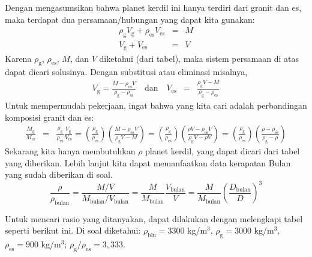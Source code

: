 \documentclass[11pt,fleqn]{exam}
\begin{document}
\begin{questions}
Dengan mengasumsikan bahwa planet kerdil ini hanya terdiri dari granit dan es, maka terdapat dua persamaan/hubungan yang dapat kita gunakan:
\begin{eqnarray*}
\rho_{\text{g}} V_{\text{g}} + \rho_{\text{es}} V_{\text{es}} &=& M\\
V_{\text{g}} + V_{\text{es}} &=& V
\end{eqnarray*}
Karena $\rho_{\text{g}}$, $\rho_{\text{es}}$, $M$, dan $V$ diketahui (dari tabel), maka sistem persamaan di atas dapat dicari solusinya. Dengan substitusi atau eliminasi misalnya, 
\begin{eqnarray*}
V_{\text{g}} = \frac{M - \rho_{\text{es}} V}{\rho_{\text{g}} - \rho_{\text{es}} }\quad \text{dan} \quad V_{\text{es}} &=& \frac{\rho_{\text{g}} V - M}{\rho_{\text{g}} - \rho_{\text{es}} }
\end{eqnarray*}
Untuk mempermudah pekerjaan, ingat bahwa yang kita cari adalah perbandingan komposisi granit dan es:
\begin{eqnarray*}
\frac{M_{\text{g}}}{M_{\text{es}}} &=& \frac{\rho_{\text{g}}}{\rho_{\text{es}}}\frac{V_{\text{g}}}{V_{\text{es}}} = \left(\frac{\rho_{\text{g}}}{\rho_{\text{es}}}\right) \left(\frac{M - \rho_{\text{es}} V}{\rho_{\text{g}} V - M}\right) = \left(\frac{\rho_{\text{g}}}{\rho_{\text{es}}}\right) \left(\frac{\rho V - \rho_{\text{es}} V}{\rho_{\text{g}} V - \rho V}\right) = \left(\frac{\rho_{\text{g}}}{\rho_{\text{es}}}\right) \left(\frac{\rho - \rho_{\text{es}}}{\rho_{\text{g}} - \rho}\right)
\end{eqnarray*}
Sekarang kita hanya membutuhkan $\rho$ planet kerdil, yang dapat dicari dari tabel yang diberikan. Lebih lanjut kita dapat memanfaatkan data kerapatan Bulan yang sudah diberikan di soal.
$$\frac{\rho}{\rho_{\text{bulan}}} = \frac{M/V}{M_{\text{bulan}}/V_{\text{bulan}}} = \frac{M}{M_{\text{bulan}}} \frac{V_{\text{bulan}}}{V} = \frac{M}{M_{\text{bulan}}} \left(\frac{D_{\text{bulan}}}{D}\right)^{3}$$

Untuk mencari rasio yang ditanyakan, dapat dilakukan dengan melengkapi tabel seperti berikut ini. Di soal diketahui: $\rho_{\text{bln}} = 3300$ kg/m$^3$, $\rho_{\text{g}} = 3000$ kg/m$^3$, $\rho_{\text{es}} = 900$ kg/m$^3$; $\rho_{\text{g}} / \rho_{\text{es}} = 3,333$. 


\end{questions}
\end{document}
